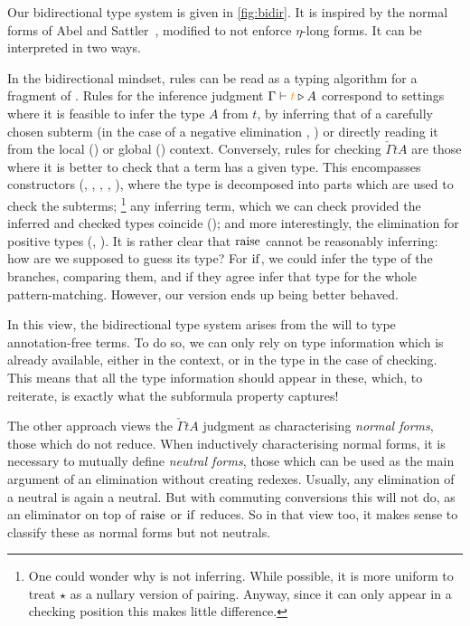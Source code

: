 \documentclass[a4paper,UKenglish,cleveref, autoref, thm-restate]{lipics-v2021}
\begin{document}
Our bidirectional type system is given in \cref{fig:bidir}. It is
inspired by the normal forms of Abel and Sattler~\cite{Abel2019a},
modified to not enforce \(\eta\)-long forms. It can be interpreted in two ways.

In the bidirectional mindset, rules can be read as
a typing algorithm for a fragment of \stlcp. Rules for the inference judgment
\(\infer{\Gamma}{t}{A}\) correspond to settings where it is feasible to infer
the type \(A\) from \(t\), by inferring that of a carefully chosen subterm
(in the case of a negative elimination , )
or directly reading it from the
local () or global () context.
Conversely, rules for checking \(\check{\Gamma}{t}{A}\) are those where it is better to check
that a term has a given type. This encompasses constructors
(, , , ,
), where the type is decomposed into parts
which are used to check the subterms;%
\footnote{One could wonder why 
is not inferring. While possible, it is more uniform to treat \(\star\)
as a nullary version of pairing. Anyway, since it can
only appear in a checking position this makes little difference.}
any inferring term, which we can check provided the inferred and checked types
coincide (); and more interestingly, the
elimination for positive types (, ).
It is rather clear that \(\rai\) cannot be reasonably inferring: how are
we supposed to guess its type? For \(\iteop\), we could infer
the type of the branches, comparing them, and if they agree infer that type
for the whole pattern-matching. However, our version ends up being better behaved.

In this view, the bidirectional type system arises from the will to
type annotation-free terms. To do so, we can only rely on type information
which is already available, either in the context, or in the type
in the case of checking. This means that all the type information
should appear in these, which, to reiterate,
is exactly what the subformula property captures!

The other approach views the \(\check{\Gamma}{t}{A}\)
judgment as characterising \emph{normal forms}, those which do not reduce.
When inductively characterising normal forms, it is necessary to mutually define
\emph{neutral forms}, those which can be used as the main argument of
an elimination without creating redexes. Usually, any elimination of a neutral
is again a neutral. But with commuting conversions this will not do,
as an eliminator on top of \(\rai\) or \(\iteop\) reduces. So in that view too,
it makes sense to classify these as normal forms but not neutrals.
\end{document}
